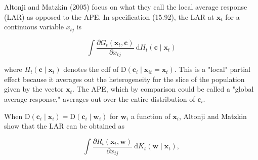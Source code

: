 \documentclass[10pt]{article}
\begin{document}
Altonji and Matzkin (2005) focus on what they call the local average response (LAR) as opposed to the APE. In specification (15.92), the LAR at $\mathbf{x}_{t}$ for a continuous variable $x_{t j}$ is


\begin{equation*}
\int \frac{\partial G_{t}\left(\mathbf{x}_{t}, \mathbf{c}\right)}{\partial x_{t j}} \mathrm{~d} H_{t}\left(\mathbf{c} \mid \mathbf{x}_{t}\right) \tag{15.95}
\end{equation*}


where $H_{t}\left(\mathbf{c} \mid \mathbf{x}_{t}\right)$ denotes the cdf of $\mathrm{D}\left(\mathbf{c}_{i} \mid \mathbf{x}_{i t}=\mathbf{x}_{t}\right)$. This is a "local" partial effect because it averages out the heterogeneity for the slice of the population given by the vector $\mathbf{x}_{t}$. The APE, which by comparison could be called a "global average response," averages out over the entire distribution of $\mathbf{c}_{i}$.

When $\mathrm{D}\left(\mathbf{c}_{i} \mid \mathbf{x}_{i}\right)=\mathrm{D}\left(\mathbf{c}_{i} \mid \mathbf{w}_{i}\right)$ for $\mathbf{w}_{i}$ a function of $\mathbf{x}_{i}$, Altonji and Matzkin show that the LAR can be obtained as


\begin{equation*}
\int \frac{\partial R_{t}\left(\mathbf{x}_{t}, \mathbf{w}\right)}{\partial x_{t j}} \mathrm{~d} K_{t}\left(\mathbf{w} \mid \mathbf{x}_{t}\right), \tag{15.96}
\end{equation*}
\end{document}
